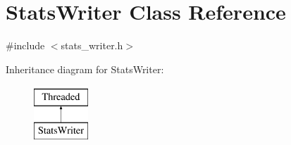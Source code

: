 \hypertarget{class_stats_writer}{
\section{StatsWriter Class Reference}
\label{class_stats_writer}
}


{\ttfamily \#include $<$stats\_\-writer.h$>$}

Inheritance diagram for StatsWriter:\begin{figure}[H]
\begin{center}
\leavevmode
\includegraphics[height=2.000000cm]{class_stats_writer}
\end{center}
\end{figure}
